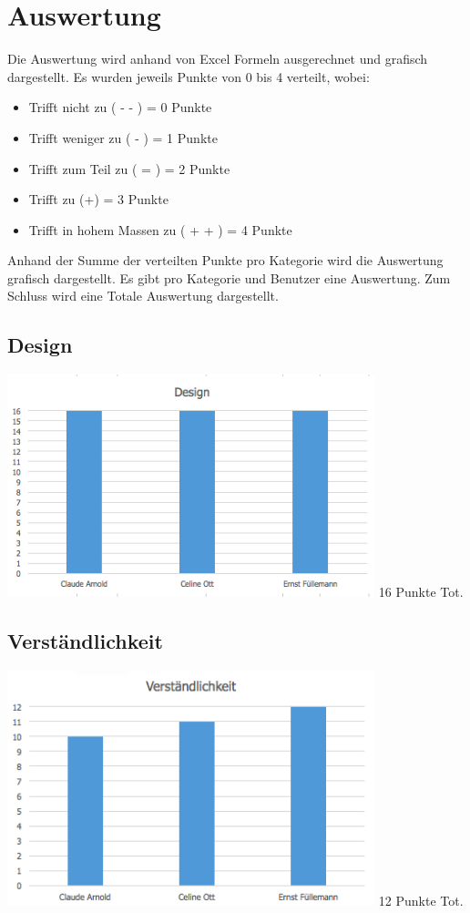 \documentclass[a4,12pt]{scrartcl}
\begin{document}
\section{Auswertung}
Die Auswertung wird anhand von Excel Formeln ausgerechnet und grafisch dargestellt. Es wurden jeweils Punkte von 0 bis 4 verteilt, wobei: 
\begin{itemize}
\item Trifft nicht zu ( - - ) = 0 Punkte
\item Trifft weniger zu ( - ) = 1 Punkte 
\item Trifft zum Teil zu ( = ) = 2 Punkte
\item Trifft zu (+) = 3 Punkte 
\item Trifft in hohem Massen zu ( + + ) = 4 Punkte  
\end{itemize}
Anhand der Summe der verteilten Punkte pro Kategorie wird die Auswertung grafisch dargestellt.
Es gibt pro Kategorie und Benutzer eine Auswertung. Zum Schluss wird eine Totale Auswertung dargestellt.

\subsection{Design}
\includegraphics[width=0.8\textwidth]{./pictures/design.png}
16 Punkte Tot.

\subsection{Verständlichkeit}
\includegraphics[width=0.8\textwidth]{./pictures/verstaendilchkeit.png}
12 Punkte Tot.
\end{document}
